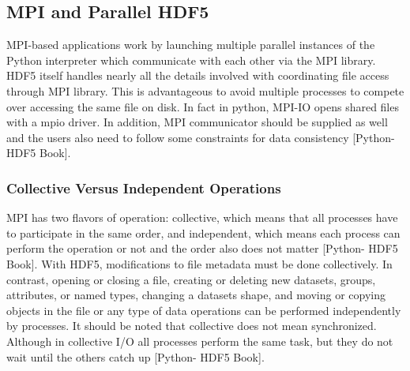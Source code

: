 \subsection{MPI and Parallel HDF5}
MPI-based applications work by launching multiple parallel instances of the Python interpreter which communicate with each other via the MPI library. 
HDF5 itself handles nearly all the details involved with coordinating file access through MPI library.
This is advantageous to avoid multiple processes to compete over accessing the same file on disk. 
In fact in python, MPI-IO opens shared files with a mpio driver. 
In addition,  MPI communicator should be supplied as well and the users also need to follow some constraints for data consistency [Python- HDF5 Book].

\subsubsection{Collective Versus Independent Operations} 
MPI has two flavors of operation: collective, which means that all processes have to participate in the same order, and independent, which means each process can perform the operation or not and the order also does not matter  [Python- HDF5 Book].
With HDF5, modifications to file metadata must be done collectively. 
In contrast, opening or closing a file, creating or deleting new datasets, groups, attributes, or named types, changing a datasets shape, and moving or copying objects in the file or any type of data operations can be performed independently by processes.
It should be noted that collective does not mean synchronized.
Although in collective I/O all processes perform the same task, but they do not wait until the others catch up [Python- HDF5 Book]. 
